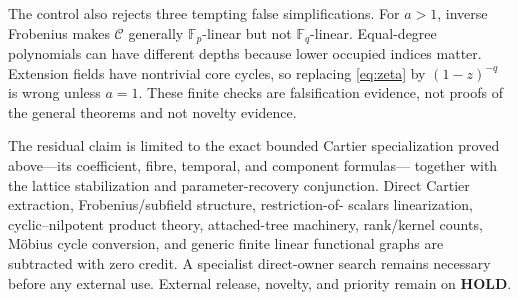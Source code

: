 \documentclass[10pt,a4paper]{amsart}
\theoremstyle{definition}
\theoremstyle{remark}
\newcommand{\F}{\mathbb F}
\begin{document}
The control also rejects three tempting false simplifications.  For
$a>1$, inverse Frobenius makes $\mathcal C$ generally $\F_p$-linear but not
$\F_q$-linear.  Equal-degree polynomials can have different depths because
lower occupied indices matter.  Extension fields have nontrivial core
cycles, so replacing \eqref{eq:zeta} by $(1-z)^{-q}$ is wrong unless $a=1$.
These finite checks are falsification evidence, not proofs of the general
theorems and not novelty evidence.

The residual claim is limited to the exact bounded Cartier specialization
proved above---its coefficient, fibre, temporal, and component formulas---
together with the lattice stabilization and parameter-recovery conjunction.
Direct Cartier extraction, Frobenius/subfield structure, restriction-of-
scalars linearization, cyclic--nilpotent product theory, attached-tree
machinery, rank/kernel counts, M\"obius cycle conversion, and generic finite
linear functional graphs are subtracted with zero credit.  A specialist
direct-owner search remains necessary before any external use.  External
release, novelty, and priority remain on \textbf{HOLD}.



\end{document}
